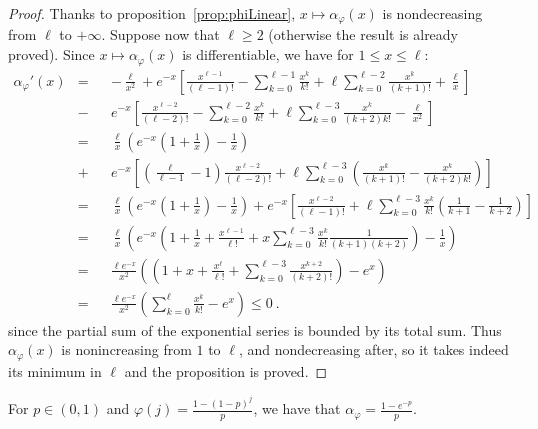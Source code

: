 \begin{proof}
  Thanks to proposition~\ref {prop:phiLinear}, $x \mapsto \alpha_{\varphi}(x)$ is nondecreasing from $\ell$ to $+\infty$. Suppose now that $\ell \geq 2$ (otherwise the result is already proved). Since $x \mapsto \alpha_{\varphi}(x)$ is differentiable, we have for $1 \leq x \leq \ell$:
  \begin{equation}
    \begin{aligned}
      \alpha_{\varphi}'(x) &=&& -\frac{\ell}{x^2} + e^{-x}\left[\frac{x^{\ell-1}}{(\ell-1)!} -  \sum_{k=0}^{\ell-1}\frac{x^k}{k!}  + \ell\sum_{k=0}^{\ell-2}\frac{x^k}{(k+1)!} + \frac{\ell}{x}\right]\\ 
      &-&& e^{-x}\left[\frac{x^{\ell-2}}{(\ell-2)!} - \sum_{k=0}^{\ell-2}\frac{x^k}{k!} + \ell\sum_{k=0}^{\ell-3}\frac{x^k}{(k+2)k!} - \frac{\ell}{x^2}\right]\\
      &=&&  \frac{\ell}{x}\left(e^{-x}\left(1+\frac{1}{x}\right)- \frac{1}{x}\right)\\
      &+&& e^{-x}\left[\left(\frac{\ell}{\ell-1}-1\right)\frac{x^{\ell-2}}{(\ell-2)!} + \ell\sum_{k=0}^{\ell-3}\left(\frac{x^k}{(k+1)!} - \frac{x^k}{(k+2)k!} \right) \right]\\
      &=&&  \frac{\ell}{x}\left(e^{-x}\left(1+\frac{1}{x}\right) - \frac{1}{x}\right) + e^{-x}\left[\frac{x^{\ell-2}}{(\ell-1)!} + \ell\sum_{k=0}^{\ell-3}\frac{x^k}{k!}\left(\frac{1}{k+1} - \frac{1}{k+2} \right) \right]\\
      &=&&  \frac{\ell}{x}\left(e^{-x}\left(1+\frac{1}{x} + \frac{x^{\ell-1}}{\ell!} + x\sum_{k=0}^{\ell-3}\frac{x^k}{k!}\frac{1}{(k+1)(k+2)}\right) - \frac{1}{x}\right)\\
      &=&&  \frac{\ell e^{-x}}{x^2}\left(\left(1+x+ \frac{x^\ell}{\ell!} + \sum_{k=0}^{\ell-3}\frac{x^{k+2}}{(k+2)!}\right) - e^x\right)\\
      &=&& \frac{\ell e^{-x}}{x^2}\left(\sum_{k=0}^{\ell} \frac{x^k}{k!} -e^x\right) \leq 0\ .
    \end{aligned}
  \end{equation}
  since the partial sum of the exponential series is bounded by its total sum. Thus $\alpha_{\varphi}(x)$ is nonincreasing from $1$ to $\ell$, and nondecreasing after, so it takes indeed its minimum in $\ell$ and the proposition is proved.
\end{proof}

\begin{proposition}
  For $p \in (0,1)$ and $\varphi(j)=\frac{1-(1-p)^j}{p}$, we have that $\alpha_{\varphi} = \frac{1 - e^{-p}}{p}$.
\label{prop:VTA}
\end{proposition}

